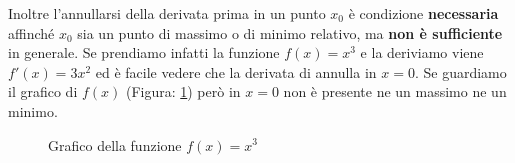 Inoltre l'annullarsi della derivata prima in un punto $x_0$ è condizione \textbf{necessaria} affinché $x_0$ sia un punto di massimo o di minimo relativo, ma \textbf{non è sufficiente} in generale. Se prendiamo infatti la funzione $f(x) = x^3$ e la deriviamo viene $f'(x) = 3x^2$ ed è facile vedere che la derivata di annulla in $x = 0$. Se guardiamo il grafico di $f(x)$ (Figura: \ref{Graficox3}) però in $x= 0$ non è presente ne un massimo ne un minimo.

\begin{figure}[h]
\centering
{}
	\caption{Grafico della funzione $f(x) = x^3$}
	\label{Graficox3}
\end{figure}
	

